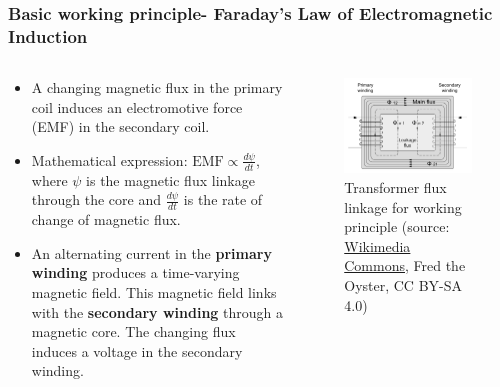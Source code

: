 \begin{frame}
	\frametitle{Basic working principle- Faraday's Law of Electromagnetic Induction}
    \begin{columns}
     \begin{column}{0.45\textwidth}
      \begin{itemize}
        \item A changing magnetic flux in the primary coil induces an electromotive force (EMF) in the secondary coil.
        \item Mathematical expression: $\text{EMF} \propto \frac{d\psi}{dt}$, where $\psi$ is the magnetic flux linkage through the core and $\frac{d\psi}{dt}$ is the rate of change of magnetic flux.
        \item An alternating current in the \textbf{primary winding} produces a time-varying magnetic field. This magnetic field links with the \textbf{secondary winding} through a magnetic core. The changing flux induces a voltage in the secondary winding.
      \end{itemize}
      \end{column}
      \begin{column}{0.45\textwidth}
			\onslide<1->
			\begin{figure}
				\centering
				\includegraphics[height=0.575\textheight]{fig/lec04/trans_flux.pdf}
                \caption{Transformer flux linkage for working principle (source: \href{https://upload.wikimedia.org/wikipedia/commons/6/63/Transformer_Flux.svg}{Wikimedia Commons}, Fred the Oyster, CC BY-SA 4.0)}
			\end{figure}
      \end{column}
    \end{columns}  
\end{frame}


